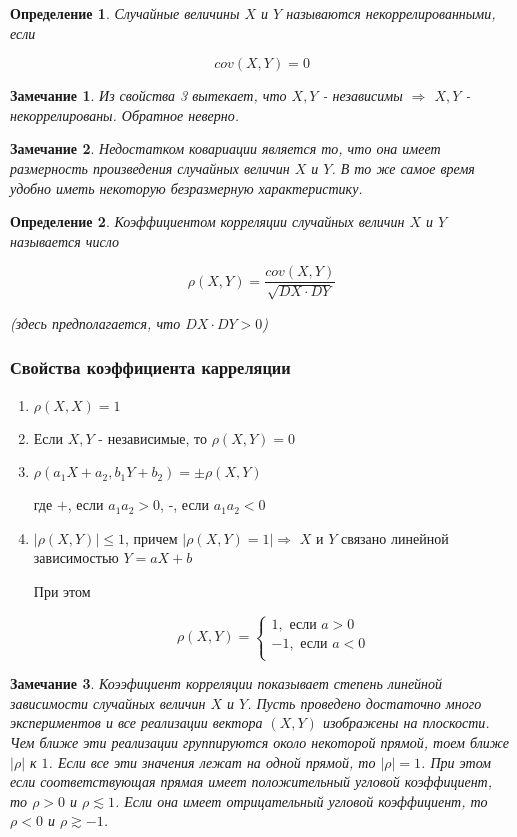 \documentclass[a4paper, 14pt]{report}
\newtheorem{defenition}{Определение}[section]
\newtheorem{note}{Замечание}[section]
\begin{document}
\begin{defenition}
    Случайные величины $X$ и $Y$ называются некоррелированными, если

    $$
    cov(X,Y) = 0
    $$
\end{defenition}

\begin{note}
    Из свойства 3 вытекает, что $X,Y$ - независимы $\Rightarrow$ $X,Y$ - некоррелированы. Обратное неверно.
\end{note}

\begin{note}
    Недостатком ковариации является то, что она имеет размерность произведения случайных величин $X$ и $Y$. В то же самое время удобно иметь некоторую безразмерную характеристику.
\end{note}

\begin{defenition}
    Коэффициентом корреляции случайных величин $X$ и $Y$ называется число

    $$
    \rho(X,Y) = \frac{cov(X,Y)}{\sqrt{DX \cdot DY}}
    $$

    (здесь предполагается, что $DX \cdot DY > 0$)
\end{defenition}

\subsubsection{Свойства коэффициента карреляции}

\begin{enumerate}
    \item $\rho(X,X) = 1$
    \item Если $X,Y$ - независимые, то $\rho(X,Y) = 0$
    \item $\rho(a_1X + a_2, b_1 Y + b_2) = \pm\rho(X,Y)$

        где $+$, если $a_1a_2 > 0$, -, если $a_1 a_2 < 0$

    \item $|\rho(X,Y)| \le 1$, причем $|\rho(X,Y) = 1| \Rightarrow$ $X$ и $Y$ связано линейной зависимостью $Y=aX+b$

        При этом

        $$
        \rho(X,Y) =
        \begin{cases}
            1, \text{ если } a > 0 \\
            -1, \text{ если } a< 0 \\
        \end{cases}
        $$
\end{enumerate}

\begin{note}
    Коээфициент корреляции показывает степень линейной зависимости случайных величин $X$ и $Y$. Пусть проведено достаточно много экспериментов и все реализации вектора $(X,Y)$ изображены на плоскости. Чем ближе эти реализации группируются около некоторой прямой, тоем ближе $|\rho|$ к $1$. Если все эти значения лежат на одной прямой, то $|\rho| = 1$. При этом если соответствующая прямая имеет положительный угловой коэффициент, то $\rho > 0$ и $\rho \lesssim 1$. Если она имеет отрицательный угловой коэффициент, то $\rho < 0$ и $\rho \gtrsim -1$.
\end{note}
\end{document}
